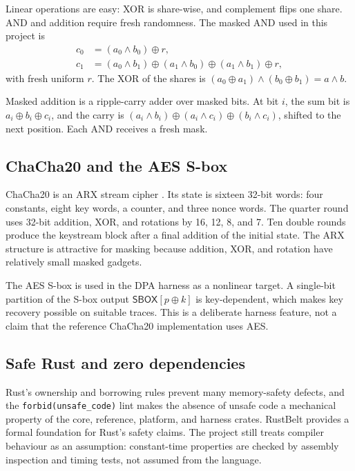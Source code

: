 \documentclass[11pt,a4paper]{article}
\newcommand{\Sbox}{\mathsf{SBOX}}
\newcommand{\code}[1]{\texttt{#1}}
\theoremstyle{plain}
\theoremstyle{definition}
\theoremstyle{remark}
\begin{document}
Linear operations are easy: XOR is share-wise, and complement flips one share. AND and
addition require fresh randomness. The masked AND used in this project is
\begin{align}
  c_0 &= (a_0\wedge b_0)\oplus r,\\
  c_1 &= (a_0\wedge b_1)\oplus(a_1\wedge b_0)\oplus(a_1\wedge b_1)\oplus r,
\end{align}
with fresh uniform \(r\). The XOR of the shares is
\((a_0\oplus a_1)\wedge(b_0\oplus b_1)=a\wedge b\).

Masked addition is a ripple-carry adder over masked bits. At bit \(i\), the sum bit is
\(a_i\oplus b_i\oplus c_i\), and the carry is
\((a_i\wedge b_i)\oplus(a_i\wedge c_i)\oplus(b_i\wedge c_i)\), shifted to the next
position. Each AND receives a fresh mask.

\subsection{ChaCha20 and the AES S-box}

ChaCha20 is an ARX stream cipher \citep{bernstein2008chacha,rfc8439}. Its state is
sixteen 32-bit words: four constants, eight key words, a counter, and three nonce
words. The quarter round uses 32-bit addition, XOR, and rotations by 16, 12, 8, and 7.
Ten double rounds produce the keystream block after a final addition of the initial
state. The ARX structure is attractive for masking because addition, XOR, and rotation
have relatively small masked gadgets.

The AES S-box \citep{fips197} is used in the DPA harness as a nonlinear target. A
single-bit partition of the S-box output \(\Sbox[p\oplus k]\) is key-dependent, which
makes key recovery possible on suitable traces. This is a deliberate harness feature,
not a claim that the reference ChaCha20 implementation uses AES.

\subsection{Safe Rust and zero dependencies}

Rust's ownership and borrowing rules prevent many memory-safety defects, and the
\code{forbid(unsafe\_code)} lint makes the absence of unsafe code a mechanical property
of the core, reference, platform, and harness crates. RustBelt
\citep{jung2018rustbelt} provides a formal foundation for Rust's safety claims. The
project still treats compiler behaviour as an assumption: constant-time properties are
checked by assembly inspection and timing tests, not assumed from the language.
\end{document}
